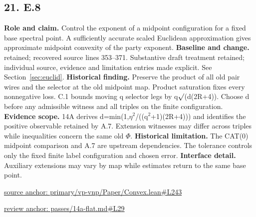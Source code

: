 \documentclass[11pt,letterpaper]{article}
\theoremstyle{definition}\newtheorem{definition}[theorem]{Definition}\newtheorem{example}[theorem]{Example}
\theoremstyle{remark}\newtheorem{remark}[theorem]{Remark}
\begin{document}
\subsection*{21. E.8}
\textbf{Role and claim.} Control the exponent of a midpoint configuration for a fixed base spectral point. A sufficiently accurate scaled Euclidean approximation gives approximate midpoint convexity of the party exponent.
\textbf{Baseline and change.} retained; recovered source lines 353--371. Substantive draft treatment retained; individual source, evidence and limitation entries made explicit. See Section~\ref{sec:euclid}.
\textbf{Historical finding.} Preserve the product of all old pair wires and the selector at the old midpoint map. Product saturation fixes every nonnegative loss. C.1 bounds moving q selector legs by q\ensuremath{\sqrt{\vphantom{x}}}(d(2R+4)). Choose d before any admissible witness and all triples on the finite configuration.
\textbf{Evidence scope.} 14A derives d=min(1,\ensuremath{\eta}\ensuremath{{}^2}/((q\ensuremath{{}^2}+1)(2R+4))) and identifies the positive observable retained by A.7. Extension witnesses may differ across triples while inequalities concern the same old \ensuremath{\Phi}.
\textbf{Historical limitation.} The CAT(0) midpoint comparison and A.7 are upstream dependencies. The tolerance controls only the fixed finite label configuration and chosen error.
\textbf{Interface detail.} Auxiliary extensions may vary by map while estimates return to the same base point.
\par\href{https://github.com/nousentllc/VP-VNP-Review/blob/8a7976933b6b2b4ffda1ad3a0dfb5fc6b6f023e8/primary/vp-vnp/Paper/Convex.lean\#L243}{source anchor: primary/vp-vnp/Paper/Convex.lean\#L243}
\par\href{https://github.com/nousentllc/VP-VNP-Review/blob/8a7976933b6b2b4ffda1ad3a0dfb5fc6b6f023e8/passes/14a-flat.md\#L29}{review anchor: passes/14a-flat.md\#L29}
\goodbreak
\end{document}
